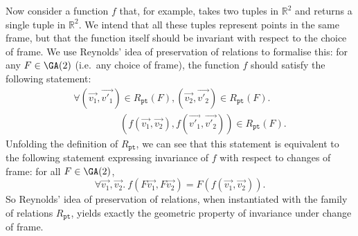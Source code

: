 Now consider a function $f$ that, for example, takes two tuples in
$\mathbb{R}^2$ and returns a single tuple in $\mathbb{R}^2$. We intend
that all these tuples represent points in the same frame, but that the
function itself should be invariant with respect to the choice of
frame. We use Reynolds' idea of preservation of relations to formalise
this: for any $F \in \GA(2)$ (i.e.~any choice of frame), the function
$f$ should satisfy the following statement:
\begin{equation}\label{eq:f-preserve-rel-frame}
  \begin{array}{l}
    \forall (\vec{v_1},\vec{v'_1}) \in R_{\texttt{pt}}(F), (\vec{v_2},\vec{v'_2}) \in R_{\texttt{pt}}(F).\\
    \hspace{2cm}(f(\vec{v_1}, \vec{v_2}), f(\vec{v'_1}, \vec{v'_2})) \in R_{\texttt{pt}}(F).
  \end{array}
\end{equation}
Unfolding the definition of $R_{\texttt{pt}}$, we can see that this
statement is equivalent to the following statement expressing
invariance of $f$ with respect to changes of frame: for all $F \in
\GA(2)$,
\begin{equation}\label{eq:f-invariant-frame}
  \forall \vec{v_1}, \vec{v_2}.\ f(F\vec{v_1},F\vec{v_2}) = F(f(\vec{v_1},\vec{v_2})).
\end{equation}
So Reynolds' idea of preservation of relations, when instantiated with
the family of relations $R_{\texttt{pt}}$, yields exactly the
geometric property of invariance under change of frame.

